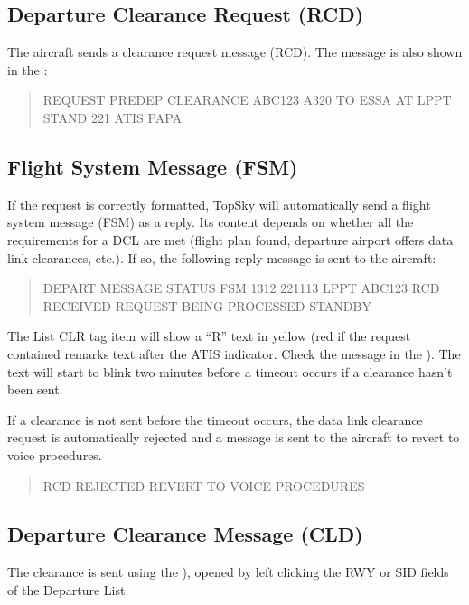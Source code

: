 \documentclass[11pt,a4paper]{memoir}
\begin{document}
\subsection*{Departure Clearance Request (RCD)}

The aircraft sends a clearance request message (RCD). The message is also shown in the \textit{}:

\begin{quote}
  REQUEST PREDEP CLEARANCE ABC123 A320 TO ESSA AT LPPT STAND 221 ATIS PAPA
\end{quote}

\subsection*{Flight System Message (FSM)}

If the request is correctly formatted, TopSky will automatically send a flight system message (FSM) as a reply. Its content depends on whether all the requirements for a DCL are met (flight plan found, departure airport offers data link clearances, etc.). If so, the following reply message is sent to the aircraft:

\begin{quote}
  DEPART MESSAGE STATUS FSM 1312 221113 LPPT ABC123 RCD RECEIVED REQUEST BEING PROCESSED STANDBY 
\end{quote}

The List CLR tag item will show a “R” text in yellow (red if the request contained remarks text after the ATIS indicator. Check the message in the \textit{}). The text will start to blink two minutes before a timeout occurs if a clearance hasn’t been sent.

If a clearance is not sent before the timeout occurs, the data link clearance request is automatically rejected and a message is sent to the aircraft to revert to voice procedures.

\begin{quote}
  RCD REJECTED REVERT TO VOICE PROCEDURES
\end{quote}

\subsection*{Departure Clearance Message (CLD)}

The clearance is sent using the \textit{}), opened by left clicking the RWY or SID fields of the Departure List. 
\end{document}
